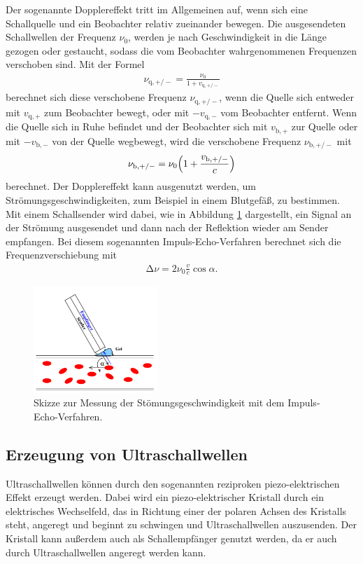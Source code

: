 Der sogenannte Dopplereffekt tritt im Allgemeinen auf, wenn sich eine
Schallquelle und ein Beobachter relativ zueinander bewegen. Die
ausgesendeten Schallwellen der Frequenz $\nu_0$, werden je nach Geschwindigkeit
in die Länge gezogen oder gestaucht, sodass die vom Beobachter wahrgenommenen
Frequenzen
verschoben sind.
Mit der Formel
\begin{align}
  \nu_{\text{q},+/-} = \frac{\nu_0}{1 + v_{\text{q},+/-}}
\end{align}
berechnet sich diese verschobene Frequenz $\nu_{\text{q},+/-}$, wenn die Quelle sich entweder
mit $v_{\text{q},+}$ zum Beobachter bewegt, oder mit $-v_{\text{q},-}$ vom Beobachter entfernt.
Wenn die Quelle sich in Ruhe befindet und der Beobachter sich mit $v_{\text{b},+}$ zur Quelle
oder mit $-v_{\text{b},-}$ von der Quelle wegbewegt, wird die verschobene
Frequenz $\nu_{\text{b},+/-}$ mit
\begin{align}
  \nu_{\text{b},+/-} = \nu_0 \Bigl(1 + \frac{v_{\text{b},+/-}}{c} \Bigr)
\end{align}
berechnet.
Der Dopplereffekt kann ausgenutzt werden, um Strömungsgeschwindigkeiten, zum
Beispiel in einem Blutgefäß, zu bestimmen. Mit einem Schallsender wird
dabei, wie in Abbildung \ref{fig:ImpulsEcho} dargestellt, ein Signal an
der Strömung ausgesendet und dann nach der Reflektion wieder am Sender
empfangen. Bei diesem sogenannten Impuls-Echo-Verfahren berechnet sich
die Frequenzverschiebung mit
\begin{align}
  \increment \nu = 2 \nu_0 \frac{v}{c} \cos{\alpha}.
\end{align}

\begin{figure}
  \centering
  \includegraphics[height=4cm]{ImpulsEcho.png}
  \caption{Skizze zur Messung der Stömungsgeschwindigkeit mit dem
  Impuls-Echo-Verfahren. \cite{anleitung}}
  \label{fig:ImpulsEcho}
\end{figure}

\subsection{Erzeugung von Ultraschallwellen}

Ultraschallwellen können durch den sogenannten reziproken piezo-elektrischen
Effekt erzeugt werden. Dabei wird ein piezo-elektrischer Kristall durch ein
elektrisches Wechselfeld,
das in Richtung einer der polaren Achsen des Kristalls steht, angeregt und
beginnt zu schwingen und Ultraschallwellen auszusenden.
Der Kristall kann außerdem auch als Schallempfänger genutzt werden, da er auch
durch Ultraschallwellen angeregt werden kann.
